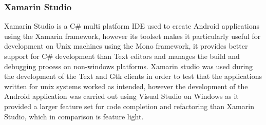 \documentclass{article}
\begin{document}
\subsubsection{Xamarin Studio}
Xamarin Studio is a C\# multi platform IDE used to create Android applications using the Xamarin framework, however its toolset makes it particularly useful for development on Unix machines using the Mono framework, it provides better support for C\# development than Text editors and manages the build and debugging process on non-windows platforms. Xamarin studio was used during the development of the Text and Gtk clients in order to test that the applications written for unix systems worked as intended, however the development of the Android application was carried out using Visual Studio on Windows as it provided a larger feature set for code completion and refactoring than Xamarin Studio, which in comparison is feature light.
\end{document}
